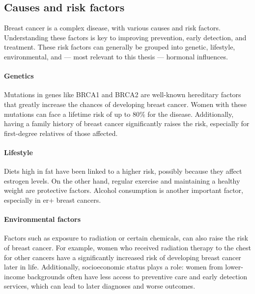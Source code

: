 \subsection{Causes and risk factors}
\label{sec:brca_risk-factors}

Breast cancer is a complex disease, with various causes and risk factors.
Understanding these factors is key to improving prevention, early detection,
and treatment.
These risk factors can generally be grouped into genetic, lifestyle,
environmental, and — most relevant to this thesis — hormonal
influences\supercite{clusan_basic_2023}.

\paragraph{Genetics}
Mutations in genes like BRCA1 and BRCA2 are well-known hereditary factors that
greatly increase the chances of developing breast cancer.
Women with these mutations can face a lifetime risk of up to 80\% for the
disease\supercite{jian_clinical_2017}.
Additionally, having a family history of breast cancer significantly raises the
risk, especially for first-degree relatives of those
affected\supercite{schairer_risk_2013}.

\paragraph{Lifestyle}
Diets high in fat have been linked to a higher risk, possibly because they
affect estrogen levels\supercite{turner_meta-analysis_2011}.
On the other hand, regular exercise and maintaining a healthy weight are
protective factors\supercite{claudia_admoun_etiology_2022}.
Alcohol consumption is another important factor, especially in \gls{er+} breast
cancers\supercite{bao_association_2011}.

\paragraph{Environmental factors}
Factors such as exposure to radiation or certain chemicals, can also raise the
risk of breast cancer.
For example, women who received radiation therapy to the chest for other
cancers have a significantly increased risk of developing breast cancer later
in life\supercite{froes_brandao_prolactin_2016}.
Additionally, socioeconomic status plays a role: women from lower-income
backgrounds often have less access to preventive care and early detection
services, which can lead to later diagnoses and worse
outcomes\supercite{cunningham_mind_2013}.

